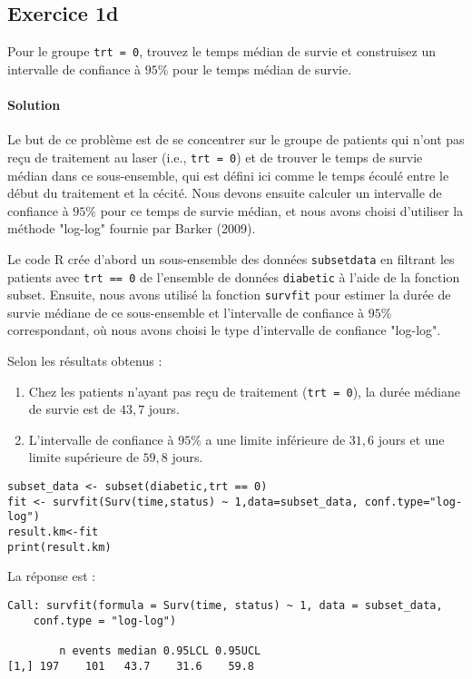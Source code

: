 \documentclass[../main.tex]{subfiles}
\begin{document}
\begin{CJK*}{UTF8}{gbsn}

\section*{Exercice 1d}
Pour le groupe \texttt{trt = 0}, trouvez le temps médian de survie et
construisez un intervalle de confiance à $95\%$ pour le temps médian de survie.
    
\paragraph{Solution}

Le but de ce problème est de se concentrer sur 
le groupe de patients qui n'ont pas reçu de traitement au laser 
(i.e., \texttt{trt = 0}) et de trouver le temps de survie médian 
dans ce sous-ensemble, qui est défini ici comme le temps écoulé 
entre le début du traitement et la cécité. 
Nous devons ensuite calculer un intervalle de confiance à 
$95\%$ pour ce temps de survie médian, et nous avons choisi d'utiliser la méthode "log-log" fournie par Barker (2009).
    
Le code R crée d'abord un sous-ensemble des données \texttt{subsetdata} 
en filtrant les patients avec \texttt{trt == 0} de l'ensemble de données 
\texttt{diabetic} à l'aide de la fonction subset. %
Ensuite, nous avons utilisé la fonction \texttt{survfit} 
pour estimer la durée de survie médiane de ce sous-ensemble 
et l'intervalle de confiance à $95\%$ correspondant, 
où nous avons choisi le type d'intervalle de confiance "log-log".
    
Selon les résultats obtenus :
\begin{enumerate}
    \item Chez les patients n'ayant pas reçu de traitement (\texttt{trt = 0}), la durée médiane de survie est de $43,7$ jours.
    \item L'intervalle de confiance à $95\%$ a une limite inférieure de $31,6$ jours et une limite supérieure de $59,8$ jours.
\end{enumerate}
    
\begin{lstlisting}
subset_data <- subset(diabetic,trt == 0)
fit <- survfit(Surv(time,status) ~ 1,data=subset_data, conf.type="log-log")
result.km<-fit
print(result.km)
\end{lstlisting}

La réponse est :

\begin{lstlisting}
Call: survfit(formula = Surv(time, status) ~ 1, data = subset_data, 
    conf.type = "log-log")
    
        n events median 0.95LCL 0.95UCL
[1,] 197    101   43.7    31.6    59.8
\end{lstlisting}

\end{CJK*}
\end{document}
